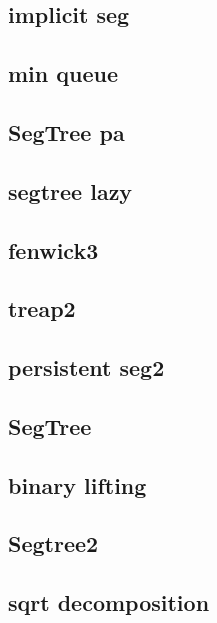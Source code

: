 \subsection{implicit seg}
\raggedbottom
\hrulefill
\subsection{min queue}
\raggedbottom
\hrulefill
\subsection{SegTree pa}
\raggedbottom
\hrulefill
\subsection{segtree lazy}
\raggedbottom
\hrulefill
\subsection{fenwick3}
\raggedbottom
\hrulefill
\subsection{treap2}
\raggedbottom
\hrulefill
\subsection{persistent seg2}
\raggedbottom
\hrulefill
\subsection{SegTree}
\raggedbottom
\hrulefill
\subsection{binary lifting}
\raggedbottom
\hrulefill
\subsection{Segtree2}
\raggedbottom
\hrulefill
\subsection{sqrt decomposition}
\raggedbottom
\hrulefill
